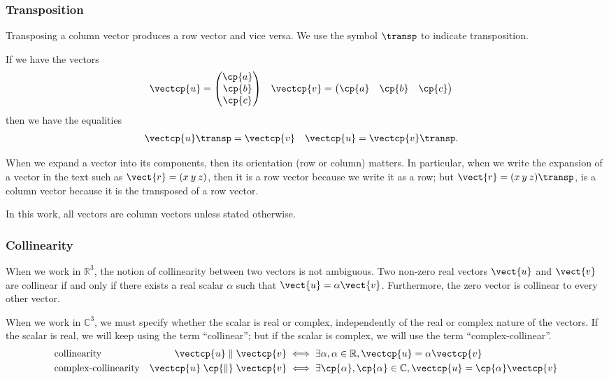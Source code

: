 \subsubsection{Transposition}
Transposing a column vector produces a row vector and vice versa.
We use the symbol $\transp$ to indicate transposition.

If we have the vectors
\begin{align}
    \vectcp{u}
    &=
    \begin{pmatrix}
        \cp{a} \\ \cp{b} \\ \cp{c}
    \end{pmatrix}
    &
    \vectcp{v}
    &=
    \begin{pmatrix}
        \cp{a} & \cp{b} & \cp{c}
    \end{pmatrix}
\end{align}
then we have the equalities
\begin{align}
    \vectcp{u}\transp &= \vectcp{v}
    &
    \vectcp{u}        &= \vectcp{v}\transp
    \text{.}
\end{align}

When we expand a vector into its components, then its orientation (row or column) matters.
In particular, when we write the expansion of a vector in the text such as
$\vect{r}= (x \: y \: z)$,
then it is a row vector because we write it as a row;
but
$\vect{r}= (x \: y \: z)\transp$,
is a column vector because it is the transposed of a row vector.

In this work, all vectors are column vectors unless stated otherwise.

\subsubsection{Collinearity}

When we work in $\mathbb{R}^3$, the notion of collinearity between two vectors is not ambiguous.
Two non-zero real vectors $\vect{u}$ and $\vect{v}$ are collinear
if and only if there exists a real scalar $\alpha$
such that $\vect{u} = \alpha \vect{v}$.
Furthermore, the zero vector is collinear to every other vector.

When we work in $\mathbb{C}^3$, we must specify whether the scalar is real or complex, independently of the real or complex nature of the vectors.
If the scalar is real, we will keep using the term ``collinear'';
but if the scalar is complex, we will use the term ``complex-collinear''.
\begin{align}
    &\text{collinearity}
    &
    \vectcp{u} \parallel \vectcp{v}
    &\iff
    \exists \alpha, \alpha \in \mathbb{R}, \vectcp{u} = \alpha \vectcp{v}
    \\
    &\text{complex-collinearity}
    &
    \vectcp{u} \;\cp{\parallel}\; \vectcp{v}
    &\iff  
    \exists \cp{\alpha}, \cp{\alpha} \in \mathbb{C}, \vectcp{u} = \cp{\alpha} \vectcp{v}
\end{align}


